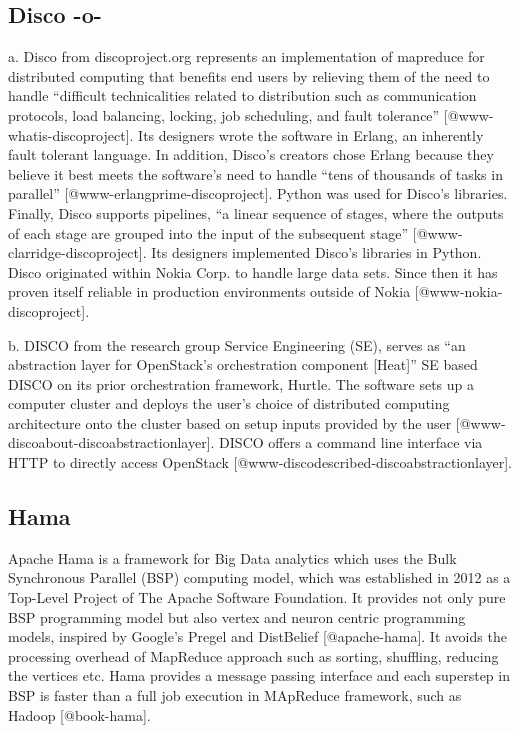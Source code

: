      
\subsection{Disco -o-}

a. Disco from discoproject.org represents an implementation of
mapreduce for distributed computing that benefits end users by
relieving them of the need to handle ``difficult technicalities
related to distribution such as communication protocols, load
balancing, locking, job scheduling, and fault
tolerance'' [@www-whatis-discoproject]. Its designers wrote the
software in Erlang, an inherently fault tolerant language. In
addition, Disco's creators chose Erlang because they believe it best
meets the software's need to handle ``tens of thousands of tasks in
parallel'' [@www-erlangprime-discoproject]. Python was used for
Disco's libraries. Finally, Disco supports pipelines, ``a linear
sequence of stages, where the outputs of each stage are grouped into
the input of the subsequent
stage'' [@www-clarridge-discoproject]. Its designers implemented
Disco's libraries in Python. Disco originated within Nokia Corp. to
handle large data sets.  Since then it has proven itself reliable in
production environments outside of
Nokia [@www-nokia-discoproject].

b. DISCO from the research group Service Engineering (SE), serves as
``an abstraction layer for OpenStack's orchestration component
[Heat]'' SE based DISCO on its prior orchestration framework,
Hurtle. The software sets up a computer cluster and deploys the user's
choice of distributed computing architecture onto the cluster based on
setup inputs provided by the
user [@www-discoabout-discoabstractionlayer].  DISCO offers a
command line interface via HTTP to directly access
OpenStack [@www-discodescribed-discoabstractionlayer].



\subsection{Hama}

Apache Hama is a framework for Big Data analytics which uses the Bulk
Synchronous Parallel (BSP) computing model, which was established in
2012 as a Top-Level Project of The Apache Software Foundation. It
provides not only pure BSP programming model but also vertex and
neuron centric programming models, inspired by Google's Pregel and
DistBelief [@apache-hama]. It avoids the processing overhead of
MapReduce approach such as sorting, shuffling, reducing the vertices
etc. Hama provides a message passing interface and each superstep in
BSP is faster than a full job execution in MApReduce framework, such
as Hadoop [@book-hama].
     
